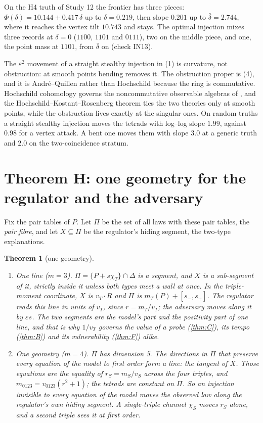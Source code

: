 \documentclass[11pt]{article}
\newtheorem{theorem}{Theorem}\renewcommand{\thetheorem}{\Alph{theorem}}
\theoremstyle{definition}\newtheorem{definition}{Definition}\newtheorem{remark}{Remark}
\begin{document}
On the H4 truth of Study 12 the frontier has three pieces: $\Phi(\delta)=10.144+0.417\,\delta$ up to $\delta=0.219$, then slope
$0.201$ up to $\bar\delta=2.744$, where it reaches the vertex tilt $10.743$ and stays. The optimal injection mixes three records at
$\delta=0$ ($1100$, $1101$ and $0111$), two on the middle piece, and one, the point mass at $1101$, from $\bar\delta$ on (check IN13).

The $\varepsilon^2$ movement of a straight stealthy injection in (1) is curvature, not obstruction: at smooth points bending removes it.
The obstruction proper is (4), and it is André--Quillen rather than Hochschild because the ring is commutative. Hochschild cohomology
governs the noncommutative observable algebras of \cite[Section~15]{PG}, and the Hochschild--Kostant--Rosenberg theorem ties the two
theories only at smooth points, while the obstruction lives exactly at the singular ones. On random truths a straight stealthy injection
moves the tetrads with log--log slope $1.99$, against $0.98$ for a vertex attack. A bent one moves them with slope $3.0$ at a generic
truth and $2.0$ on the two-coincidence stratum.

\section{Theorem H: one geometry for the regulator and the adversary}\label{sec:H}
Fix the pair tables of $P$. Let $\Pi$ be the set of all laws with these pair tables, the \emph{pair fibre}, and let $X\subseteq\Pi$ be
the regulator's hiding segment, the two-type explanations.

\begin{theorem}[one geometry]\label{thm:H}
\begin{enumerate}
\item[(1)] \emph{One line} ($m=3$). $\Pi=\{P+s\chi_T\}\cap\Delta$ is a segment, and $X$ is a sub-segment of it, strictly inside it
unless both types meet a wall at once. In the triple-moment coordinate, $X$ is $v_T\cdot R$ and $\Pi$ is $m_T(P)+[s_-,s_+]$. The
regulator reads this line in units of $v_T$, since $r=m_T/v_T$; the adversary moves along it by $\varepsilon s$. The two segments are the
model's part and the positivity part of one line, and that is why $1/v_T$ governs the value of a probe (\cref{thm:C}), its tempo
(\cref{thm:B}) and its vulnerability (\cref{thm:F}) alike.
\item[(2)] \emph{One geometry} ($m=4$). $\Pi$ has dimension 5. The directions in $\Pi$ that preserve every equation of the model to
first order form a line: the tangent of $X$. Those equations are the equality of $r_S=m_S/v_S$ across the four triples, and
$m_{0123}=v_{0123}(r^2+1)$; the tetrads are constant on $\Pi$. So an injection invisible to every equation of the model moves the
observed law along the regulator's own hiding segment. A single-triple channel $\chi_S$ moves $r_S$ alone, and a second triple sees it at
first order.
\end{enumerate}
\end{theorem}
\end{document}
